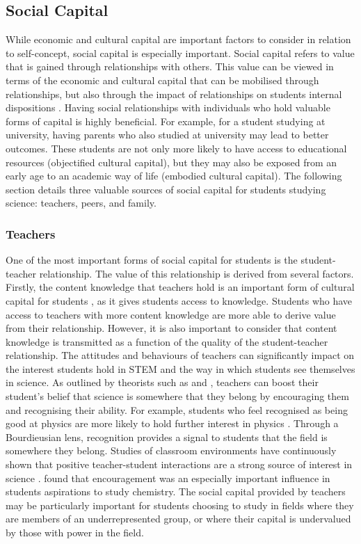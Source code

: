 \subsection{Social Capital}
While economic and cultural capital are important factors to consider in relation to self-concept, social capital is especially important. Social capital refers to value that is gained through relationships with others. This value can be viewed in terms of the economic and cultural capital that can be mobilised through relationships, but also through the impact of relationships on students internal dispositions \citep{Adler2017}. Having social relationships with individuals who hold valuable forms of capital is highly beneficial. For example, for a student studying at university, having parents who also studied at university may lead to better outcomes. These students are not only more likely to have access to educational resources (objectified cultural capital), but they may also be exposed from an early age to an academic way of life (embodied cultural capital). The following section details three valuable sources of social capital for students studying science: teachers, peers, and family.

\subsubsection{Teachers}
One of the most important forms of social capital for students is the student-teacher relationship. The value of this relationship is derived from several factors. Firstly, the content knowledge that teachers hold is an important form of cultural capital for students \citep{goldhaber2000does,wayne2003teacher,keller2017impact}, as it gives students access to knowledge. Students who have access to teachers with more content knowledge are more able to derive value from their relationship. However, it is also important to consider that content knowledge is transmitted as a function of the quality of the student-teacher relationship. The attitudes and behaviours of teachers can significantly impact on the interest students hold in STEM \citep{keller2017impact} and the way in which students see themselves in science. As outlined by theorists such as \cite{bandura1986explanatory} and \cite{siegle2007increasing}, teachers can boost their student's belief that science is somewhere that they belong by encouraging them and recognising their ability. For example, students who feel recognised as being good at physics are more likely to hold further interest in physics \citep{Hazari2017}. Through a Bourdieusian lens, recognition provides a signal to students that the field is somewhere they belong. Studies of classroom environments have continuously shown that positive teacher-student interactions are a strong source of interest in science \citep{osborne2003attitudes,keller2017impact}. \cite{mujtaba2018students} found that encouragement was an especially important influence in students aspirations to study chemistry. The social capital provided by teachers may be particularly important for students choosing to study in fields where they are members of an underrepresented group, or where their capital is undervalued by those with power in the field.


